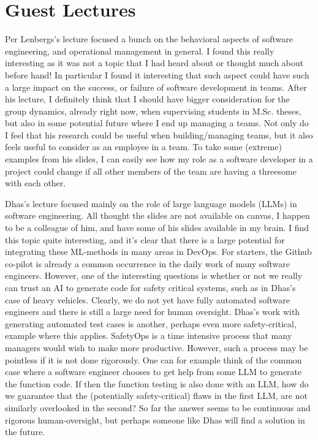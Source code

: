 \documentclass[a4paper,11pt]{article}
\begin{document}

\section{Guest Lectures}
Per Lenbergs's lecture focused a bunch on the behavioral aspects of software engineering, and operational management in general. I found this really interesting as it was not a topic that I had heard about or thought much about before hand! In particular I found it interesting that such aspect could have such a large impact on the success, or failure of software development in teams. After his lecture, I definitely think that I should have bigger consideration for the group dynamics, already right now, when supervising students in M.Sc. theses, but also in some potential future where I end up managing a teams. Not only do I feel that his research could be useful when building/managing teams, but it also feels useful to consider as an employee in a team. To take some (extreme) examples from his slides, I can easily see how my role as a software developer in a project could change if all other members of the team are having a threesome with each other.


Dhas's lecture focused mainly on the role of large language models (LLMs) in software engineering. All thought the slides are not available on canvas, I happen to be a colleague of him, and have some of his slides available in my brain. I find this topic quite interesting, and it's clear that there is a large potential for integrating these ML-methods in many areas in DevOps. For starters, the Github co-pilot is already a common occurrence in the daily work of many software engineers. However, one of the interesting questions is whether or not we really can trust an AI to generate code for safety critical systems, such as in Dhas's case of heavy vehicles. Clearly, we do not yet have fully automated software engineers and there is still a large need for human oversight. Dhas's work with generating automated test cases is another, perhaps even more safety-critical, example where this applies. SafetyOps is a time intensive process that many managers would wish to make more productive. However, such a process may be pointless if it is not done rigorously. One can for example think of the common case where a software engineer chooses to get help from some LLM to generate the function code. If then the function testing is also done with an LLM, how do we guarantee that the (potentially safety-critical) flaws in the first LLM, are not similarly overlooked in the second? So far the answer seems to be continuous and rigorous human-oversight, but perhaps someone like Dhas will find a solution in the future.
\end{document}
